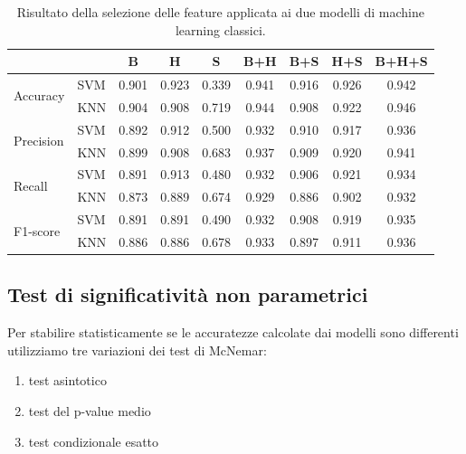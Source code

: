 \begin{table}
    \centering
    \begin{tabular}{l l c c c c c c c}
        \hline
        & & B     & H     & S     & B+H   & B+S   & H+S   & B+H+S \\
        \hline
        \multirow{2}{*}{Accuracy}   & SVM & 0.901 & 0.923 & 0.339 & 0.941 & 0.916 & 0.926 & 0.942 \\
                                    & KNN & 0.904 & 0.908 & 0.719 & 0.944 & 0.908 & 0.922 & 0.946 \\
        \hline
        \multirow{2}{*}{Precision}  & SVM & 0.892 & 0.912 & 0.500 & 0.932 & 0.910 & 0.917 & 0.936 \\      
                                    & KNN & 0.899 & 0.908 & 0.683 & 0.937 & 0.909 & 0.920 & 0.941 \\
        \hline
        \multirow{2}{*}{Recall}     & SVM & 0.891 & 0.913 & 0.480 & 0.932 & 0.906 & 0.921 & 0.934 \\
                                    & KNN & 0.873 & 0.889 & 0.674 & 0.929 & 0.886 & 0.902 & 0.932 \\
        \hline
        \multirow{2}{*}{F1-score}   & SVM & 0.891 & 0.891 & 0.490 & 0.932 & 0.908 & 0.919 & 0.935 \\
                                    & KNN & 0.886 & 0.886 & 0.678 & 0.933 & 0.897 & 0.911 & 0.936 \\
        \hline
    \end{tabular}
    \caption{Risultato della selezione delle feature applicata ai due modelli di machine learning classici.}
    \label{tab:features}
\end{table}

\subsection{Test di significatività non parametrici}
\label{ssec:tesi-di-significativita-non-parametrici}

Per stabilire statisticamente se le accuratezze calcolate dai modelli sono differenti utilizziamo tre variazioni dei test di McNemar\cite{fagerland2013mcnemar}:

\begin{enumerate}
    \item test asintotico
    \item test del p-value medio
    \item test condizionale esatto
\end{enumerate}

